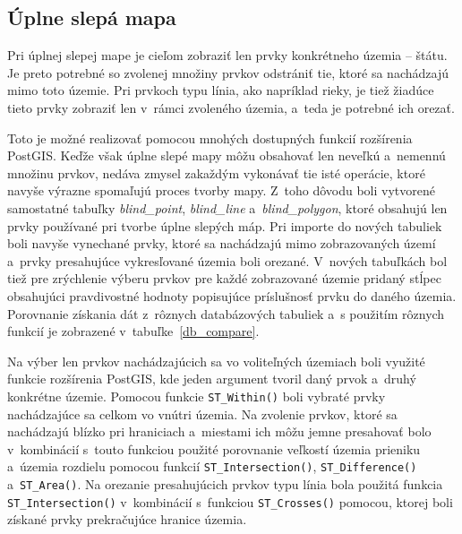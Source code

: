\subsection*{Úplne slepá mapa}
Pri úplnej slepej mape je cieľom zobraziť len prvky konkrétneho územia -- štátu. Je preto potrebné so zvolenej množiny prvkov odstrániť tie, ktoré sa nachádzajú mimo toto územie. Pri prvkoch typu línia, ako napríklad rieky, je tiež žiadúce tieto prvky zobraziť len v~rámci zvoleného územia, a~teda je potrebné ich orezať. 

Toto je možné realizovať pomocou mnohých dostupných funkcií rozšírenia PostGIS. Keďže však úplne slepé mapy môžu obsahovať len neveľkú a~nemennú množinu prvkov, nedáva zmysel zakaždým vykonávať tie isté operácie, ktoré navyše výrazne spomaľujú proces tvorby mapy. Z~toho dôvodu boli vytvorené samostatné tabuľky {\it blind\_point}, {\it blind\_line} a~{\it blind\_polygon}, ktoré obsahujú len prvky používané pri tvorbe úplne slepých máp. Pri importe do nových tabuliek boli navyše vynechané prvky, ktoré sa nachádzajú mimo zobrazovaných území a~prvky presahujúce vykresľované územia boli orezané. V~nových tabuľkách bol tiež pre zrýchlenie výberu prvkov pre každé zobrazované územie pridaný stĺpec obsahujúci pravdivostné hodnoty popisujúce príslušnosť prvku do daného územia. Porovnanie získania dát z~rôznych databázových tabuliek a~s použitím rôznych funkcií je zobrazené v~tabuľke~\ref{db_compare}.

Na výber len prvkov nachádzajúcich sa vo voliteľných územiach boli využité funkcie rozšírenia PostGIS, kde jeden argument tvoril daný prvok a~druhý konkrétne územie. Pomocou funkcie {\tt ST\_Within()} boli vybraté prvky nachádzajúce sa celkom vo vnútri územia. Na zvolenie prvkov, ktoré sa nachádzajú blízko pri hraniciach a~miestami ich môžu jemne presahovať bolo v~kombinácií s~touto funkciou použité porovnanie veľkostí územia prieniku a~územia rozdielu pomocou funkcií {\tt ST\_Intersection()}, {\tt ST\_Difference()} a~{\tt ST\_Area()}. Na orezanie presahujúcich prvkov typu línia bola použitá funkcia {\tt ST\_Intersection()} v~kombinácií s~funkciou {\tt ST\_Crosses()} pomocou, ktorej boli získané prvky prekračujúce hranice územia.


